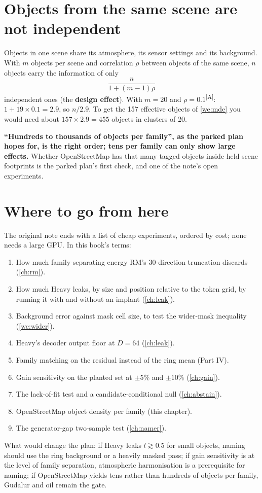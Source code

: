 \documentclass[11pt,a4paper,oneside,openany]{book}
\newcommand{\assm}{\textsuperscript{\textsf{\scriptsize[A]}}}
\begin{document}
\section{Objects from the same scene are not independent}

Objects in one scene share its atmosphere, its sensor settings and its background. With $m$ objects per scene and correlation $\rho$ between objects of the same scene, $n$
objects carry the information of only
\[
  \frac{n}{1+(m-1)\rho}
\]
independent ones (the \textbf{design effect}). With $m=20$ and $\rho=0.1$\assm: $1+19\times0.1=2.9$, so $n/2.9$. To get the 157 effective objects of \cref{we:mde} you would need about
$157\times2.9=455$ objects in clusters of 20.

\textbf{``Hundreds to thousands of objects per family'', as the parked plan hopes for, is the right order; tens per family can only show large effects.} Whether OpenStreetMap
has that many tagged objects inside held scene footprints is the parked plan's first check, and one of the note's open experiments.

\section{Where to go from here}

The original note ends with a list of cheap experiments, ordered by cost; none needs a large GPU. In this book's terms:
\begin{enumerate}
\item How much family-separating energy RM's 30-direction truncation discards (\cref{ch:rm}).
\item How much Heavy leaks, by size and position relative to the token grid, by running it with and without an implant (\cref{ch:leak}).
\item Background error against mask cell size, to test the wider-mask inequality (\cref{we:wider}).
\item Heavy's decoder output floor at $D=64$ (\cref{ch:leak}).
\item Family matching on the residual instead of the ring mean (Part IV).
\item Gain sensitivity on the planted set at $\pm5\%$ and $\pm10\%$ (\cref{ch:gain}).
\item The lack-of-fit test and a candidate-conditional null (\cref{ch:abstain}).
\item OpenStreetMap object density per family (this chapter).
\item The generator-gap two-sample test (\cref{ch:namer}).
\end{enumerate}
What would change the plan: if Heavy leaks $l\gtrsim0.5$ for small objects, naming should use the ring background or a heavily masked pass; if gain sensitivity is at the level
of family separation, atmospheric harmonisation is a prerequisite for naming; if OpenStreetMap yields tens rather than hundreds of objects per family, Gudalur and oil remain the
gate.
\end{document}
